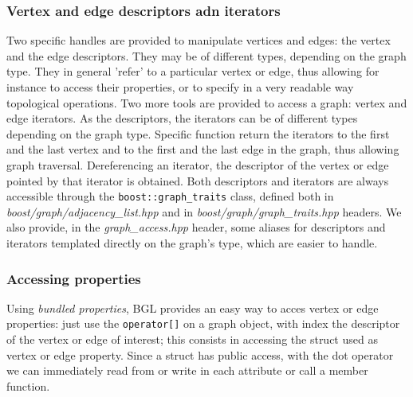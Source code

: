 \documentclass[10pt]{article} %
\newcommand{\classname}[1]{\texttt{#1}}
\begin{document}
	\subsubsection{Vertex and edge descriptors adn iterators}
	Two specific handles are provided to manipulate vertices and edges: the vertex and the edge descriptors. They may be of different types, depending on the graph type. They in general 'refer' to a particular vertex or edge, thus allowing for instance to access their properties, or to specify in a very readable way topological operations. \newline
	Two more tools are provided to access a graph: vertex and edge iterators. As the descriptors, the iterators can be of different types depending on the graph type. Specific function return the iterators to the first and the last vertex and to the first and the last edge in the graph, thus allowing graph traversal. Dereferencing an iterator, the descriptor of the vertex or edge pointed by that iterator is obtained. \newline
	Both descriptors and iterators are always accessible through the \classname{boost::graph\_traits} class, defined both in \textit{boost/graph/adjacency\_list.hpp} and in \textit{boost/graph/graph\_traits.hpp} headers. We also provide, in the \textit{graph\_access.hpp} header, some aliases for descriptors and iterators templated directly on the graph's type, which are easier to handle.
	
	\subsubsection{Accessing properties}
	Using \textit{bundled properties}, BGL provides an easy way to acces vertex or edge properties: just use the \texttt{operator[]} on a graph object, with index the descriptor of the vertex or edge of interest; this consists in accessing the struct used as vertex or edge property. Since a struct has public access, with the dot operator we can immediately read from or write in each attribute or call a member function.	
	
	\newpage
\end{document}
